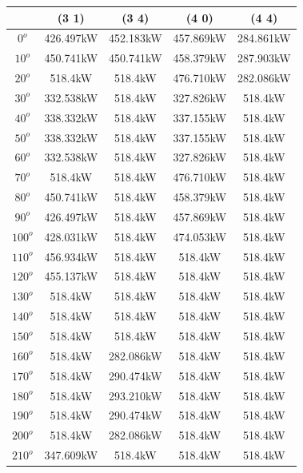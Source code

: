         \begin{table}[H]
        	\centering
        	\begin{tabular}{|c|c|c|c|c|} \hline
        			& (3 1)		& (3 4)		& (4 0)		& (4 4)		\\ \hline
        		$0^o$	& 426.497kW	& 452.183kW	& 457.869kW	& 284.861kW	\\ \hline
        		$10^o$	& 450.741kW	& 450.741kW	& 458.379kW	& 287.903kW	\\ \hline
        		$20^o$	& 518.4kW	& 518.4kW	& 476.710kW	& 282.086kW	\\ \hline
        		$30^o$	& 332.538kW	& 518.4kW	& 327.826kW	& 518.4kW	\\ \hline
        		$40^o$	& 338.332kW	& 518.4kW	& 337.155kW	& 518.4kW	\\ \hline
        		$50^o$	& 338.332kW	& 518.4kW	& 337.155kW	& 518.4kW	\\ \hline
        		$60^o$	& 332.538kW	& 518.4kW	& 327.826kW	& 518.4kW	\\ \hline
        		$70^o$	& 518.4kW	& 518.4kW	& 476.710kW	& 518.4kW	\\ \hline
        		$80^o$	& 450.741kW	& 518.4kW	& 458.379kW	& 518.4kW	\\ \hline
        		$90^o$	& 426.497kW	& 518.4kW	& 457.869kW	& 518.4kW	\\ \hline
        		$100^o$	& 428.031kW	& 518.4kW	& 474.053kW	& 518.4kW	\\ \hline
        		$110^o$	& 456.934kW	& 518.4kW	& 518.4kW	& 518.4kW	\\ \hline
        		$120^o$	& 455.137kW	& 518.4kW	& 518.4kW	& 518.4kW	\\ \hline
        		$130^o$	& 518.4kW	& 518.4kW	& 518.4kW	& 518.4kW	\\ \hline
        		$140^o$	& 518.4kW	& 518.4kW	& 518.4kW	& 518.4kW	\\ \hline
        		$150^o$	& 518.4kW	& 518.4kW	& 518.4kW	& 518.4kW	\\ \hline
        		$160^o$	& 518.4kW	& 282.086kW	& 518.4kW	& 518.4kW	\\ \hline
        		$170^o$	& 518.4kW	& 290.474kW	& 518.4kW	& 518.4kW	\\ \hline
        		$180^o$	& 518.4kW	& 293.210kW	& 518.4kW	& 518.4kW	\\ \hline
        		$190^o$	& 518.4kW	& 290.474kW	& 518.4kW	& 518.4kW	\\ \hline
        		$200^o$	& 518.4kW	& 282.086kW	& 518.4kW	& 518.4kW	\\ \hline
        		$210^o$	& 347.609kW	& 518.4kW	& 518.4kW	& 518.4kW	\\ \hline

\end{tabular}
\end{table}
